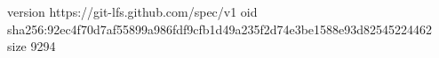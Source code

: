 version https://git-lfs.github.com/spec/v1
oid sha256:92ec4f70d7af55899a986fdf9cfb1d49a235f2d74e3be1588e93d82545224462
size 9294
